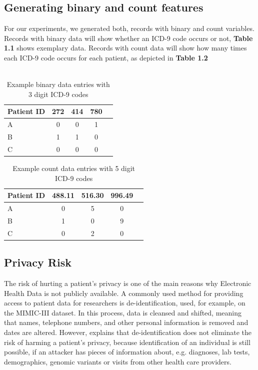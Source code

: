 \documentclass[11pt, a4paper, oneside]{book}
\begin{document}
\subsection{Generating binary and count features}
For our experiments, we generated both, records with binary and count variables. Records with binary data will show whether an ICD-9 code occurs or not, \textbf{Table 1.1} shows exemplary data. Records with count data will show how many times each ICD-9 code occurs for each patient, as depicted in \textbf{Table 1.2}
\\
\\

\begin{table}
\begin{center}
\begin{tabular}{l*{3}{c}r }
Patient ID & 272 & 414 & 780 \\
\hline
A & 0 & 0 & 1 \\
B & 1 & 1 & 0 \\
C & 0 & 0 & 0 \\
\hline
\end{tabular}
\caption{Example binary data entries with 3 digit ICD-9 codes}
\label{tab:example-binary}
\end{center}
\end{table}


\begin{table}
\begin{center}
\begin{tabular}{l*{3}{c}r }
Patient ID & 488.11 & 516.30 & 996.49 \\
\hline
A & 0 & 5 & 0 \\
B & 1 & 0 & 9 \\
C & 0 & 2 & 0 \\
\hline
\end{tabular}
\caption{Example count data entries with 5 digit ICD-9 codes}
\label{tab:example-count}
\end{center}
\end{table}

\subsection{Privacy Risk}
The risk of hurting a patient's privacy is one of the main reasons why Electronic Health Data is not publicly available. A commonly used method for providing access to patient data for researchers is de-identification, used, for example, on the MIMIC-III dataset. In this process, data is cleansed and shifted, meaning that names, telephone numbers, and other personal information is removed and dates are altered. \citep{johnson2016mimic}
However, \citep{Choi2017} explains that de-identification does not eliminate the risk of harming a patient's privacy, because identification of an individual is still possible, if an attacker has pieces of information about, e.g. diagnoses, lab tests, demographics, genomic variants or visits from other health care providers.
\end{document}
